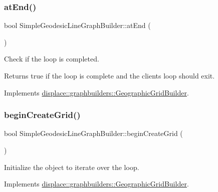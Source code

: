 \subsubsection{\texorpdfstring{atEnd()}{atEnd()}}
{\footnotesize\ttfamily bool Simple\+Geodesic\+Line\+Graph\+Builder\+::at\+End (\begin{DoxyParamCaption}{ }\end{DoxyParamCaption})\hspace{0.3cm}{\ttfamily [virtual]}}



Check if the loop is completed. 

\begin{DoxyReturn}{Returns}
true if the loop is complete and the client\textquotesingle{}s loop should exit. 
\end{DoxyReturn}


Implements \mbox{\hyperlink{classdisplace_1_1graphbuilders_1_1_geographic_grid_builder_abf20b262ee44a64508458483d26f42c1}{displace\+::graphbuilders\+::\+Geographic\+Grid\+Builder}}.

\mbox{\label{classdisplace_1_1graphbuilders_1_1_simple_geodesic_line_graph_builder_a87d7dbaefebb501f491fc4bb2afeb8eb}} 
\subsubsection{\texorpdfstring{beginCreateGrid()}{beginCreateGrid()}}
{\footnotesize\ttfamily bool Simple\+Geodesic\+Line\+Graph\+Builder\+::begin\+Create\+Grid (\begin{DoxyParamCaption}{ }\end{DoxyParamCaption})\hspace{0.3cm}{\ttfamily [virtual]}}



Initialize the object to iterate over the loop. 



Implements \mbox{\hyperlink{classdisplace_1_1graphbuilders_1_1_geographic_grid_builder_ac929320efe7bd7c38064250651263999}{displace\+::graphbuilders\+::\+Geographic\+Grid\+Builder}}.

